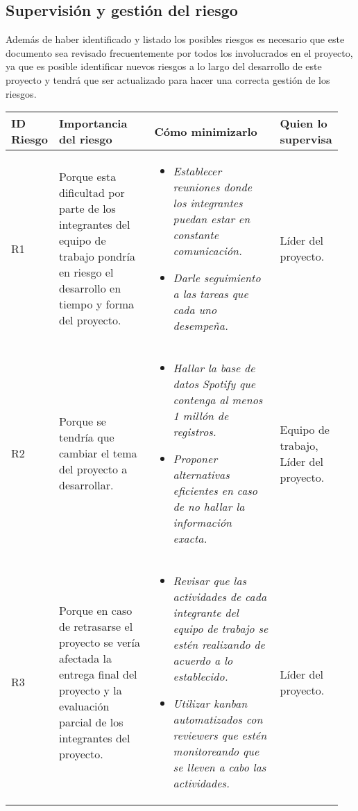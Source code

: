 \documentclass[12pt,a4paper]{article}
\begin{document}
\subsection{Supervisión y gestión del riesgo}
Además de haber identificado y listado los posibles riesgos es necesario que este documento sea revisado frecuentemente por todos los involucrados en el proyecto, ya que es posible identificar nuevos riesgos a lo largo del desarrollo de este proyecto y tendrá que ser actualizado para hacer una correcta gestión de los riesgos.
\vspace{1 cm}
\begin{table}[h!]
\begin{tabular}{|p{0.10\linewidth}|p{0.30\linewidth}|p{0.40\linewidth}|p{0.15\linewidth}|}
\hline
\textbf{ID Riesgo}&\textbf{Importancia del riesgo}&\textbf{Cómo minimizarlo}&\textbf{Quien lo supervisa}
\\\hline
R1&Porque esta dificultad por parte de los integrantes del equipo de trabajo pondría en riesgo el desarrollo en tiempo y forma del proyecto.&\begin{itemize}
\item \textit{Establecer reuniones donde los integrantes puedan estar en constante comunicación.}
\item \textit{Darle seguimiento a las tareas que cada uno desempeña.}
\end{itemize}
&Líder del proyecto.\\\hline

R2&Porque se tendría que cambiar el tema del proyecto a desarrollar.&\begin{itemize}
\item \textit{Hallar la base de datos Spotify que contenga al menos 1 millón de registros.}
\item \textit{Proponer alternativas eficientes en caso de no hallar la información exacta.}
\end{itemize}&Equipo de trabajo, Líder del proyecto.\\\hline

R3&Porque en caso de retrasarse el proyecto se vería afectada la entrega final del proyecto y la evaluación parcial de los integrantes del proyecto.&\begin{itemize}
\item \textit{Revisar que las actividades de cada integrante del equipo de trabajo se estén realizando de acuerdo a lo establecido.}
\item \textit{Utilizar kanban automatizados con reviewers que estén monitoreando que se lleven a cabo las actividades.}
\end{itemize} 
&Líder del proyecto.\\\hline


\end{tabular}
\end{table}
\end{document}
